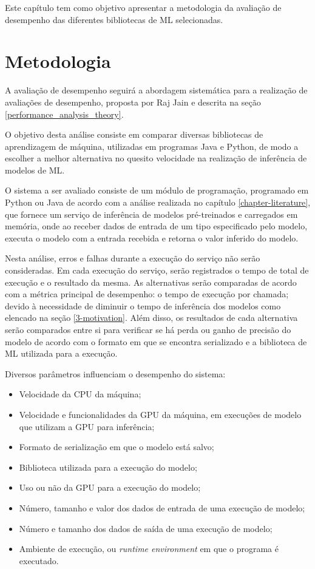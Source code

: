 Este capítulo tem como objetivo apresentar a metodologia da avaliação de desempenho das diferentes bibliotecas de ML selecionadas.

\section{Metodologia}

A avaliação de desempenho seguirá a abordagem sistemática para a realização de avaliações de desempenho, proposta por Raj Jain e descrita na seção \ref{performance_analysis_theory}.

O objetivo desta análise consiste em comparar diversas bibliotecas de aprendizagem de máquina, utilizadas em programas Java e Python, de modo a escolher a melhor alternativa no quesito velocidade na realização de inferência de modelos de ML.

O sistema a ser avaliado consiste de um módulo de programação, programado em Python ou Java de acordo com a análise realizada no capítulo \ref{chapter-literature}, que fornece um serviço de inferência de modelos pré-treinados e carregados em memória, onde ao receber dados de entrada de um tipo especificado pelo modelo, executa o modelo com a entrada recebida e retorna o valor inferido do modelo.

Nesta análise, erros e falhas durante a execução do serviço não serão consideradas. Em cada execução do serviço, serão registrados o tempo de total de execução e o resultado da mesma. As alternativas serão comparadas de acordo com a métrica principal de desempenho: o tempo de execução por chamada; devido à necessidade de diminuir o tempo de inferência dos modelos como elencado na seção \ref{3-motivation}. Além disso, os resultados de cada alternativa serão comparados entre si para verificar se há perda ou ganho de precisão do modelo de acordo com o formato em que se encontra serializado e a biblioteca de ML utilizada para a execução.

Diversos parâmetros influenciam o desempenho do sistema:

\begin{itemize}
  \item Velocidade da CPU da máquina;
  \item Velocidade e funcionalidades da GPU da máquina, em execuções de modelo que utilizam a GPU para inferência;
  \item Formato de serialização em que o modelo está salvo;
  \item Biblioteca utilizada para a execução do modelo;
  \item Uso ou não da GPU para a execução do modelo;
  \item Número, tamanho e valor dos dados de entrada de uma execução de modelo;
  \item Número e tamanho dos dados de saída de uma execução de modelo;
  \item Ambiente de execução, ou \textit{runtime environment} em que o programa é executado.
\end{itemize}

